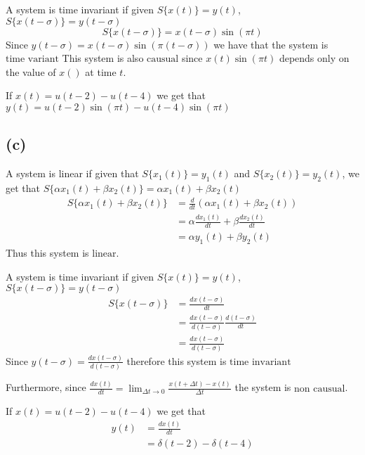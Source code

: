 \documentclass[12pt]{article}
\begin{document}
A system is time invariant if given $S\{x(t)\}=y(t)$, $S\{x(t-\sigma)\}=y(t-\sigma)$
$$S\{x(t-\sigma)\}=x(t-\sigma)\sin(\pi t)$$
Since $y(t-\sigma)=x(t-\sigma)\sin(\pi (t-\sigma))$ we have that the system is $\boxed{\text{time variant}}$
This system is also $\boxed{\text{causual}}$ since $x(t)\sin(\pi t)$ depends only on the value of $x()$ at time $t$.

If $x(t)=u(t-2)-u(t-4)$ we get that $y(t)=\boxed{u(t-2)\sin(\pi t)-u(t-4)\sin(\pi t)}$
\subsection*{(c)}
A system is linear if given that $S\{x_1(t)\}=y_1(t)$ and $S\{x_2(t)\}=y_2(t)$, we get that $S\{\alpha x_1(t)+\beta x_2(t)\}=\alpha x_1(t) +\beta x_2(t)$
\begin{align*}
S\{\alpha x_1(t)+\beta x_2(t)\}&=\frac{d}{dt}(\alpha x_1(t)+\beta x_2(t))\\
&=\alpha\frac{dx_1(t)}{dt}+\beta\frac{dx_2(t)}{dt}\\
&=\alpha y_1(t)+\beta y_2(t)
\end{align*}
Thus this system is $\boxed{\text{linear}}$.

A system is time invariant if given $S\{x(t)\}=y(t)$, $S\{x(t-\sigma)\}=y(t-\sigma)$
\begin{align*}
S\{x(t-\sigma)\}&=\frac{d x(t-\sigma)}{dt}\\
&=\frac{d x(t-\sigma)}{d (t-\sigma)}\frac{d (t-\sigma)}{dt}\\
&=\frac{d x(t-\sigma)}{d (t-\sigma)}
\end{align*}
Since $y(t-\sigma)=\frac{d x(t-\sigma)}{d (t-\sigma)}$ therefore this system is $\boxed{\text{time invariant}}$

Furthermore, since $\frac{d x(t)}{dt}=\lim_{\Delta t\to0}\frac{x(t+\Delta t)-x(t)}{\Delta t}$ the system is $\boxed{\text{non causual}}$.

If $x(t)=u(t-2)-u(t-4)$ we get that
\begin{align*}
y(t)&=\frac{d x(t)}{dt}\\
&=\boxed{\delta(t-2)-\delta(t-4)}
\end{align*}
\end{document}
